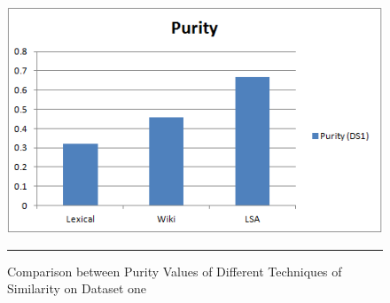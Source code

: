 \begin{figure}[htbp]
	\centering
		\includegraphics{./Figures/Purity_DS1_1.png}
		\rule{35em}{0.5pt}
	\caption[Comparison between Purity Values of Different Techniques of Similarity on Dataset one]{Comparison between Purity Values of Different Techniques of Similarity on Dataset one}
	\label{fig:F120}
\end{figure}

